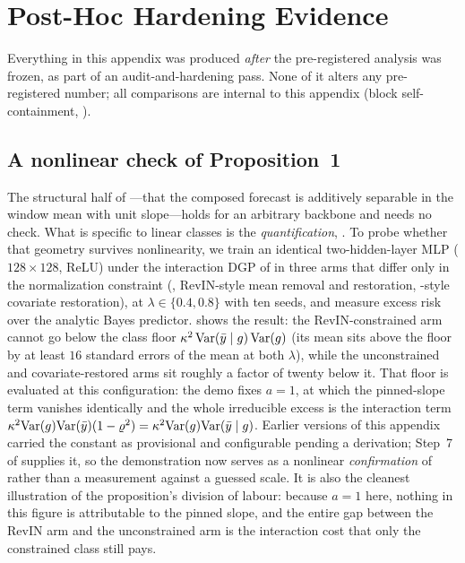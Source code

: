 \section{Post-Hoc Hardening Evidence}\label{app:g7}

Everything in this appendix was produced \emph{after} the pre-registered
analysis was frozen, as part of an audit-and-hardening pass. None of it
alters any pre-registered number; all comparisons are internal to this
appendix (block self-containment, ).

\subsection{A nonlinear check of Proposition~1}\label{app:g7-mlp}

The structural half of ---that the composed forecast
 is additively separable in the window mean with unit
slope---holds for an arbitrary backbone and needs no check. What is specific
to linear classes is the \emph{quantification}, . To
probe whether that geometry survives nonlinearity, we train an identical
two-hidden-layer MLP ($128\times128$, ReLU) under the interaction DGP of
 in three arms that differ only in the normalization
constraint (\rawm{}, RevIN-style mean removal and restoration, \cnm{}-style
covariate restoration), at $\lambda \in \{0.4, 0.8\}$ with ten seeds, and
measure excess risk over the analytic Bayes predictor.
 shows the result: the RevIN-constrained arm cannot go
below the class floor $\kappa^2\,\mathrm{Var}(\bar y \mid g)\,\mathrm{Var}(g)$ (its mean
sits above the floor by at least $16$ standard errors of the mean at both
$\lambda$), while the unconstrained and covariate-restored arms sit roughly
a factor of twenty below it. That floor is  evaluated at
this configuration: the demo fixes $a = 1$, at which the pinned-slope term
vanishes identically and the whole irreducible excess is the interaction
term $\kappa^2 \mathrm{Var}(g)\mathrm{Var}(\bar y)(1-\varrho^2) = \kappa^2\mathrm{Var}(g)\mathrm{Var}(\bar
y \mid g)$. Earlier versions of this appendix carried the constant as
provisional and configurable pending a derivation; Step~7 of
 supplies it, so the demonstration now serves as a
nonlinear \emph{confirmation} of  rather than a measurement
against a guessed scale. It is also the cleanest illustration of the
proposition's division of labour: because $a=1$ here, nothing in this
figure is attributable to the pinned slope, and the entire gap between the
RevIN arm and the unconstrained arm is the interaction cost that only the
constrained class still pays.

